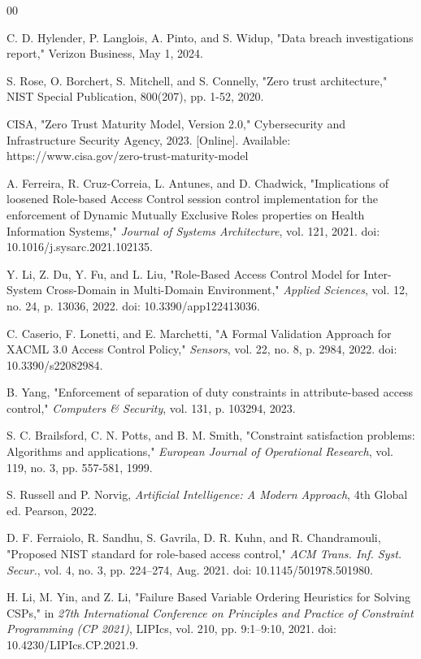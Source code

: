 \documentclass[conference]{IEEEtran}
\begin{document}
	
	\begin{thebibliography}{00}

         C. D. Hylender, P. Langlois, A. Pinto, and S. Widup, "Data breach investigations report," Verizon Business, May 1, 2024.

         S. Rose, O. Borchert, S. Mitchell, and S. Connelly, "Zero trust architecture," NIST Special Publication, 800(207), pp. 1-52, 2020.

         CISA, "Zero Trust Maturity Model, Version 2.0," Cybersecurity and Infrastructure Security Agency, 2023. [Online]. Available: https://www.cisa.gov/zero-trust-maturity-model

         A. Ferreira, R. Cruz-Correia, L. Antunes, and D. Chadwick, "Implications of loosened Role-based Access Control session control implementation for the enforcement of Dynamic Mutually Exclusive Roles properties on Health Information Systems," \textit{Journal of Systems Architecture}, vol. 121, 2021. doi: 10.1016/j.sysarc.2021.102135.

         Y. Li, Z. Du, Y. Fu, and L. Liu, "Role-Based Access Control Model for Inter-System Cross-Domain in Multi-Domain Environment," \textit{Applied Sciences}, vol. 12, no. 24, p. 13036, 2022. doi: 10.3390/app122413036.

         C. Caserio, F. Lonetti, and E. Marchetti, "A Formal Validation Approach for XACML 3.0 Access Control Policy," \textit{Sensors}, vol. 22, no. 8, p. 2984, 2022. doi: 10.3390/s22082984.

         B. Yang, "Enforcement of separation of duty constraints in attribute-based access control," \textit{Computers \& Security}, vol. 131, p. 103294, 2023.

         S. C. Brailsford, C. N. Potts, and B. M. Smith, "Constraint satisfaction problems: Algorithms and applications," \textit{European Journal of Operational Research}, vol. 119, no. 3, pp. 557-581, 1999.

         S. Russell and P. Norvig, \textit{Artificial Intelligence: A Modern Approach}, 4th Global ed. Pearson, 2022.

         D. F. Ferraiolo, R. Sandhu, S. Gavrila, D. R. Kuhn, and R. Chandramouli, "Proposed NIST standard for role-based access control," \textit{ACM Trans. Inf. Syst. Secur.}, vol. 4, no. 3, pp. 224–274, Aug. 2021. doi: 10.1145/501978.501980.

         H. Li, M. Yin, and Z. Li, "Failure Based Variable Ordering Heuristics for Solving CSPs," in \textit{27th International Conference on Principles and Practice of Constraint Programming (CP 2021)}, LIPIcs, vol. 210, pp. 9:1–9:10, 2021. doi: 10.4230/LIPIcs.CP.2021.9.


\end{thebibliography}
\end{document}
